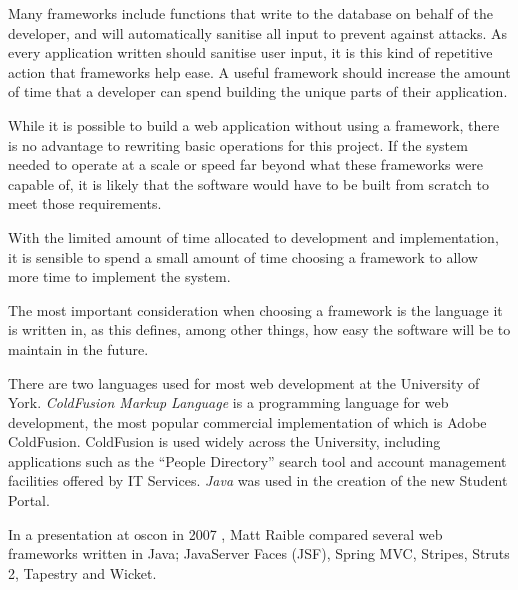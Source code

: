 \documentclass[]{scrartcl}
\begin{document}
Many frameworks include functions that write to the database on behalf of the
developer, and will automatically sanitise all input to prevent against
attacks. As every application written should sanitise user input, it is this
kind of repetitive action that frameworks help ease. A useful framework should
increase the amount of time that a developer can spend building the unique
parts of their application.

While it is possible to build a web application without using a framework,
there is no advantage to rewriting basic operations for this project. If the
system needed to operate at a scale or speed far beyond what these frameworks
were capable of, it is likely that the software would have to be built from
scratch to meet those requirements.

With the limited amount of time allocated to development and implementation,
it is sensible to spend a small amount of time choosing a framework to allow
more time to implement the system.



The most important consideration when choosing a framework is the language it
is written in, as this defines, among other things, how easy the software will
be to maintain in the future.


There are two languages used for most web development at the University of
York. \emph{ColdFusion Markup Language} is a programming language for web
development, the most popular commercial implementation of which is Adobe
ColdFusion. ColdFusion is used widely across the University, including
applications such as the ``People Directory'' search tool and account
management facilities offered by IT Services. \emph{Java} was used in the
creation of the new Student Portal.

In a presentation at \gls{oscon} in 2007 \cite{raible2007javawebframeworks},
Matt Raible compared several web frameworks written in Java; JavaServer Faces
(JSF), Spring MVC, Stripes, Struts 2, Tapestry and Wicket.

\end{document}
